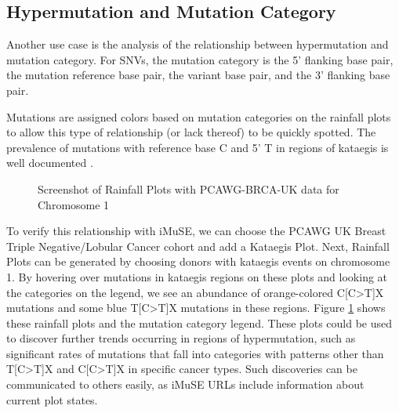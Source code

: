 \documentclass[12pt, letterpaper]{article}
\begin{document}
\subsection{Hypermutation and Mutation Category}
Another use case is the analysis of the relationship between hypermutation and mutation category.
For SNVs, the mutation category is the 5' flanking base pair, the mutation reference base pair, the variant base pair, and the 3' flanking base pair.

Mutations are assigned colors based on mutation categories on the rainfall plots to allow this type of relationship (or lack thereof) to be quickly spotted.
The prevalence of mutations with reference base C and 5' T in regions of kataegis is well documented \citep{taylor2013dna}.
\begin{figure}
    \centering
    \caption{Screenshot of Rainfall Plots with PCAWG-BRCA-UK data for Chromosome 1}
    \label{fig:caseStudy2}
\end{figure}

To verify this relationship with iMuSE, we can choose the PCAWG UK Breast Triple Negative/Lobular Cancer cohort and add a Kataegis Plot.
Next, Rainfall Plots can be generated by choosing donors with kataegis events on chromosome 1.
By hovering over mutations in kataegis regions on these plots and looking at the categories on the legend, we see an abundance of orange-colored C[C\textgreater T]X mutations and some blue T[C\textgreater T]X mutations in these regions.
Figure \ref{fig:caseStudy2} shows these rainfall plots and the mutation category legend.
These plots could be used to discover further trends occurring in regions of hypermutation, such as significant rates of mutations that fall into categories with patterns other than T[C\textgreater T]X and C[C\textgreater T]X in specific cancer types.
Such discoveries can be communicated to others easily, as iMuSE URLs include information about current plot states.
\end{document}
